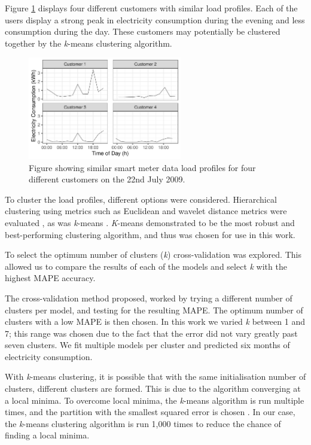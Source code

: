 Figure \ref{fig:similar_customers} displays four different customers with similar load profiles. Each of the users display a strong peak in electricity consumption during the evening and less consumption during the day. These customers may potentially be clustered together by the \textit{k}-means clustering algorithm.

\begin{figure}
	\centering
	\includegraphics[width=0.6\textwidth]{Chapter5/figures/short-term-forecasting/ebp_net-resizeimage-1.pdf}
	\caption{Figure showing similar smart meter data load profiles for four different customers on the 22nd July 2009.}
	\label{fig:similar_customers}
\end{figure}

To cluster the load profiles, different options were considered. Hierarchical clustering using metrics such as Euclidean and wavelet distance metrics were evaluated \cite{BIMJ:BIMJ4710240520}, as was \textit{k}-means \cite{forgy1965cluster}.\textit{ K}-means demonstrated to be the most robust and best-performing clustering algorithm, and thus was chosen for use in this work.

To select the optimum number of clusters (\textit{k}) cross-validation was explored. This allowed us to compare the results of each of the models and select \textit{k} with the highest MAPE accuracy.

The cross-validation method proposed, worked by trying a different number of clusters per model, and testing for the resulting MAPE. The optimum number of clusters with a low MAPE is then chosen. In this work we varied \textit{k} between 1 and 7; this range was chosen due to the fact that the error did not vary greatly past seven clusters. We fit multiple models per cluster and predicted six months of electricity consumption.

With \textit{k}-means clustering, it is possible that with the same initialisation number of clusters, different clusters are formed. This is due to the algorithm converging at a local minima. To overcome local minima, the \textit{k}-means algorithm is run multiple times, and the partition with the smallest squared error is chosen \cite{Jain2010}. In our case, the \textit{k}-means clustering algorithm is run 1,000 times to reduce the chance of finding a local minima. 

